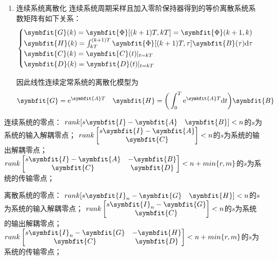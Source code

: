 \documentclass[11pt,a4paper]{ctexart}
\renewcommand{\d}{{\rm d}}
\newcommand{\e}{{\rm e}}
\newcommand{\bm}{\symbfit}
\begin{document}
\begin{enumerate}
            作 Z 反变换得
            \[
            \begin{cases}
                x_i(k+1)=z_ix_i(k)+u(k)\\
                y(k)=\sum\limits_{i=1}^nk_ix_i(k)+du(k)
            \end{cases}
            \]

            即
            \[
            \begin{cases}
                \bm{x}(k+1)={\rm diag}(z_i)\bm{x}(k)+\begin{bmatrix}1\\ \vdots\\1\end{bmatrix}u(k)\\
                y(k)=[k_1\quad\cdots k_n]\bm{x}(k)+du(k)
            \end{cases}
            \]
            \item 连续系统离散化
            连续系统周期采样且加入零阶保持器得到的等价离散系统系数矩阵有如下关系：
            \[
            \begin{cases}
                \bm{G}(k)=\bm{\Phi}[(k+1)T,kT]=\bm{\Phi}(k+1,k)\\
                \bm{H}(k)=\int_{kT}^{(k+1)T}\bm{\Phi}[(k+1)T,\tau]\bm{B}(\tau)\d\tau\\
                \bm{C}(k)=\bm{C}(t)|_{t=kT}\\
                \bm{D}(k)=\bm{D}(t)|_{t=kT}
            \end{cases}
            \]

            因此线性连续定常系统的离散化模型为
            \[
            \bm{G}=\e^{\bm{A}T}\quad\bm{H}=\bigg(\int_0^T\e^{\bm{A}T}\d t\bigg)\bm{B}
            \]
        \end{enumerate}

        连续系统的零点：
        $rank[s\bm{I}-\bm{A}\quad\bm{B}]<n$的$s$为系统的输入解耦零点；
        $rank\begin{bmatrix}s\bm{I}-\bm{A}\\\bm{C}\end{bmatrix}<n$的$s$为系统的输出解耦零点；
        $rank\begin{bmatrix}s\bm{I}-\bm{A} & -\bm{B}\\\bm{C} & \bm{D}\end{bmatrix}<n+min\{r,m\}$的$s$为系统的传输零点；

        离散系统的零点：
        $rank[s\bm{I}_n-\bm{G}\quad\bm{H}]<n$的$s$为系统的输入解耦零点；
        $rank\begin{bmatrix}s\bm{I}_n-\bm{G}\\\bm{C}\end{bmatrix}<n$的$s$为系统的输出解耦零点；
        $rank\begin{bmatrix}s\bm{I}_n-\bm{G} & -\bm{H}\\\bm{C} & \bm{D}\end{bmatrix}<n+min\{r,m\}$的$s$为系统的传输零点；
\end{document}
